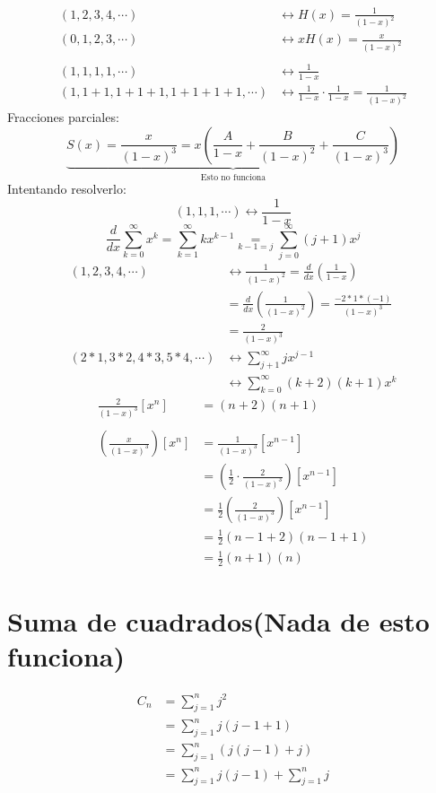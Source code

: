 \documentclass[../main.tex]{subfiles}
\begin{document}
\begin{align*}
	(1,2,3,4,\cdots)
	&\longleftrightarrow
	H(x)= \frac{1}{(1-x)^2}\\
	(0,1,2,3,\cdots)
	&\longleftrightarrow
	xH(x)= \frac{x}{(1-x)^2}\\
	\\
	(1,1,1,1,\cdots)
	&\longleftrightarrow
	\frac{1}{1-x} \\
	(1,1+1,1+1+1,1+1+1+1,\cdots)
	&\longleftrightarrow
	\frac{1}{1-x}
	\cdot
	\frac{1}{1-x}
	= \frac{1}{(1-x)^2}
\end{align*}
Fracciones parciales:
\[
	\underbrace
	{
		S(x) = \frac{x}{(1-x)^3} =
		x\left(
			\frac{A}{1-x}
			+\frac{B}{(1-x)^2}
			+\frac{C}{(1-x)^3}
		\right)
	}_
	{
		\text{Esto no funciona}
	}
\]
Intentando resolverlo:
\[
	(1,1,1,\cdots)
	\longleftrightarrow \frac{1}{1-x}
\]
\[
	\frac{d}{dx}
	\sum_{k=0}^\infty x^k
	=
	\sum_{k=1}^\infty kx^{k-1}
	\underset{k-1=j}{=}
	\sum_{j=0}^\infty (j+1)x^j
\]
\begin{align*}
	(1,2,3,4,\cdots)
	&\longleftrightarrow
	\frac{1}{(1-x)^2}
	= \frac{d}{dx}
	\left(
		\frac{1}{1-x}
	\right)\\
	&=
	\frac{d}{dx}
	\left(
		\frac{1}{(1-x)^2}
	\right)= \frac{-2*1*(-1)}{(1-x)^3}\\
	&= \frac{2}{(1-x)^3}\\
	(2*1,3*2,4*3,5*4,\cdots)
	&\longleftrightarrow
	\sum_{j+1}^\infty jx^{j-1}\\
	&\longleftrightarrow
	\sum_{k=0}^\infty (k+2)(k+1)x^k
\end{align*}
\begin{align*}
	\frac{2}{(1-x)^3}[x^n] &= (n+2)(n+1)\\
	\\
	\left(
		\frac{x}{(1-x)^3}
	\right)
	[x^n]
	&= \frac{1}{(1-x)^3}
	[x^{n-1}]\\
	&=
	\left(
		\frac{1}{2}
		\cdot
		\frac{2}{(1-x)^3}
	\right)
	[x^{n-1}]\\
	&= \frac{1}{2}
	\left(
		\frac{2}{(1-x)^3}
	\right)
	[x^{n-1}]\\
	&= \frac{1}{2}
	(n-1+2)(n-1+1)\\
	&= \frac{1}{2} (n+1)(n)
\end{align*}
\section{Suma de cuadrados(Nada de esto funciona)}%
\label{sec:suma_de_cuadrados}
\begin{align*}
	C_n &= \sum_{j=1}^n j^2\\
		&= \sum_{j=1}^n j(j-1+1)\\
		&= \sum_{j=1}^n (j(j-1)+j)\\
		&= \sum_{j=1}^n j(j-1) +
		\boxed
		{
			\sum_{j=1}^n j
		}
\end{align*}
\end{document}
